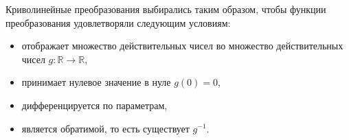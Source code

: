 \documentclass[12pt,fleqn,unicode]{article}
\begin{document}
Криволинейные преобразования выбирались таким образом, чтобы функции преобразования удовлетворяли следующим условиям:
\begin{itemize}
    \item отображает множество действительных чисел во множество действительных чисел $g: \mathbb{R} \to \mathbb{R}$,
    \item принимает нулевое значение в нуле $g(0) = 0$,
    \item дифференцируется по параметрам,
    \item является обратимой, то есть существует $g^{-1}$.
\end{itemize}
\end{document}
